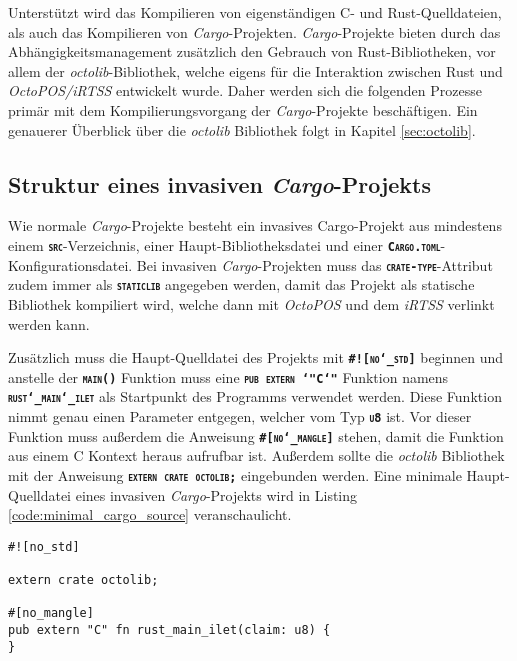 Unterstützt wird das Kompilieren von eigenständigen C- und Rust-Quelldateien, als auch das Kompilieren von
\textit{Cargo}-Projekten. \textit{Cargo}-Projekte bieten durch das Abhängigkeitsmanagement zusätzlich den Gebrauch
von Rust-Bibliotheken, vor allem der \textit{octolib}-Bibliothek,
welche eigens für die Interaktion zwischen Rust und \textit{OctoPOS/iRTSS}
entwickelt wurde.
Daher werden sich die folgenden Prozesse primär mit dem Kompilierungsvorgang der \textit{Cargo}-Projekte
beschäftigen.
Ein genauerer Überblick über die \textit{octolib} Bibliothek folgt in Kapitel \ref{sec:octolib}.

\subsection{Struktur eines invasiven \textit{Cargo}-Projekts}

Wie normale \textit{Cargo}-Projekte besteht ein invasives Cargo-Projekt aus mindestens einem
\texttt{\textsc{\textbf{src}}}-Verzeichnis, einer Haupt-Bibliotheksdatei
und einer \texttt{\textsc{\textbf{Cargo.toml}}}- \\
Konfigurationsdatei.
Bei invasiven \textit{Cargo}-Projekten muss das \texttt{\textsc{\textbf{crate-type}}}-Attribut zudem immer als
\texttt{\textsc{\textbf{staticlib}}} angegeben werden,
damit das Projekt als statische Bibliothek kompiliert wird, welche dann mit \textit{OctoPOS} und dem \textit{iRTSS} 
verlinkt werden kann.

Zusätzlich muss die Haupt-Quelldatei des Projekts mit \texttt{\textsc{\textbf{\#![no\char`_std]}}} beginnen und 
anstelle der \texttt{\textsc{\textbf{main()}}} Funktion muss eine
\texttt{\textsc{\textbf{pub extern \char`"C\char`"}}} Funktion namens \\
\texttt{\textsc{\textbf{rust\char`_main\char`_ilet}}} als Startpunkt des Programms verwendet werden.
Diese Funktion nimmt genau einen Parameter entgegen, welcher vom Typ \texttt{\textsc{\textbf{u8}}} ist.
Vor dieser Funktion muss außerdem die Anweisung \texttt{\textsc{\textbf{\#[no\char`_mangle]}}} stehen,
damit die Funktion aus einem C Kontext heraus aufrufbar ist.
Außerdem sollte die \textit{octolib} Bibliothek mit der Anweisung \texttt{\textsc{\textbf{extern crate octolib;}}}
eingebunden werden. Eine minimale Haupt-Quelldatei eines invasiven \textit{Cargo}-Projekts wird in Listing
\ref{code:minimal_cargo_source} veranschaulicht.

\begin{lstlisting}[float,caption={
Eine minimale Haupt-Quelldatei eines invasiven \textit{Cargo}-Projekts
},label=code:minimal_cargo_source]
#![no_std]

extern crate octolib;

#[no_mangle]
pub extern "C" fn rust_main_ilet(claim: u8) {
}
\end{lstlisting}

